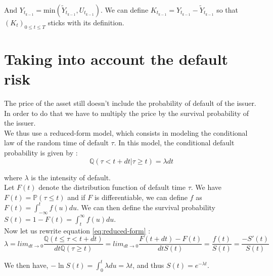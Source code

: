 \documentclass[a4paper,11pt,english]{book}
\begin{document}
And $Y_{t_{k-1}}=\text{min}(\widetilde{Y}_{t_{k-1}},U_{t_{k-1}})$. We can define $K_{t_{k-1}}=Y_{t_{k-1}}-\widetilde{Y}_{t_{k-1}}$ so that $(K_{t})_{0\leq t\leq T}$ sticks with its definition.
\section{Taking into account the default risk}
The price of the asset still doesn't include the probability of default of the issuer. In order to do that we have to multiply the price by the survival probability of the issuer.\\

We thus use a reduced-form model, which consists in modeling the conditional law of the random time of default $\tau$. In this model, the conditional default probability is given by :
\begin{equation}
    \mathbb{Q}(\tau<t+dt|\tau\geq t)=\lambda dt
    \label{eq:reduced-form}
\end{equation}


where $\lambda$ is the intensity of default.\\

Let $F(t)$ denote the distribution function of default time $\tau$. We have $F(t)=\mathbb{P}(\tau\leq t)$ and if $F$ is differentiable, we can define $f$ as $F(t)=\int_{-\infty}^{t}f(u)du$.
We can then define the survival probability $S(t) = 1-F(t) = \int_{t}^{\infty}f(u)du$.\\

Now let us rewrite equation \ref{eq:reduced-form} :
$$\lambda = lim_{dt\to 0}\frac{\mathbb{Q}(t\leq \tau<t+dt)}{dt\mathbb{Q}(\tau\geq t)} = lim_{dt\to 0}\frac{F(t+dt)-F(t)}{dt S(t)}=\frac{f(t)}{S(t)}=\frac{-S'(t)}{S(t)}$$

We then have, $-\ln{S(t)}=\int_{0}^{t}\lambda du = \lambda t$, and thus $S(t)=e^{-\lambda t}$.
\end{document}
